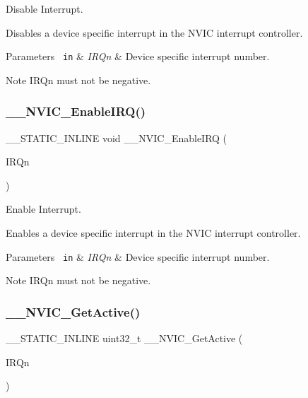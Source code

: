 Disable Interrupt. 

Disables a device specific interrupt in the N\+V\+IC interrupt controller. 
\begin{DoxyParams}[1]{Parameters}
\mbox{\texttt{ in}}  & {\em I\+R\+Qn} & Device specific interrupt number. \\
\hline
\end{DoxyParams}
\begin{DoxyNote}{Note}
I\+R\+Qn must not be negative. 
\end{DoxyNote}
\mbox{\label{group___c_m_s_i_s___core___n_v_i_c_functions_ga71227e1376cde11eda03fcb62f1b33ea}} 
\subsubsection{\texorpdfstring{\_\_NVIC\_EnableIRQ()}{\_\_NVIC\_EnableIRQ()}}
{\footnotesize\ttfamily \+\_\+\+\_\+\+S\+T\+A\+T\+I\+C\+\_\+\+I\+N\+L\+I\+NE void \+\_\+\+\_\+\+N\+V\+I\+C\+\_\+\+Enable\+I\+RQ (\begin{DoxyParamCaption}\item[{I\+R\+Qn\+\_\+\+Type}]{I\+R\+Qn }\end{DoxyParamCaption})}



Enable Interrupt. 

Enables a device specific interrupt in the N\+V\+IC interrupt controller. 
\begin{DoxyParams}[1]{Parameters}
\mbox{\texttt{ in}}  & {\em I\+R\+Qn} & Device specific interrupt number. \\
\hline
\end{DoxyParams}
\begin{DoxyNote}{Note}
I\+R\+Qn must not be negative. 
\end{DoxyNote}
\mbox{\label{group___c_m_s_i_s___core___n_v_i_c_functions_gaa2837003c28c45abf193fe5e8d27f593}} 
\subsubsection{\texorpdfstring{\_\_NVIC\_GetActive()}{\_\_NVIC\_GetActive()}}
{\footnotesize\ttfamily \+\_\+\+\_\+\+S\+T\+A\+T\+I\+C\+\_\+\+I\+N\+L\+I\+NE uint32\+\_\+t \+\_\+\+\_\+\+N\+V\+I\+C\+\_\+\+Get\+Active (\begin{DoxyParamCaption}\item[{I\+R\+Qn\+\_\+\+Type}]{I\+R\+Qn }\end{DoxyParamCaption})}



